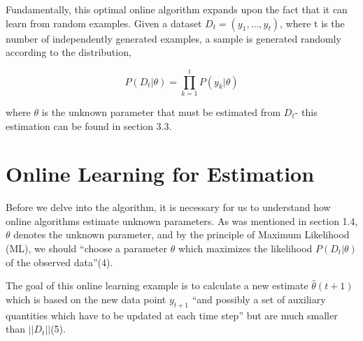 																																																																																	        \noindent Fundamentally, this optimal online algorithm expands upon the fact that it can learn from random examples. Given a dataset $D_t = (y_1,...,y_t)$, where t is the number of independently generated examples, a sample is generated randomly according to the distribution, 
																																																																																			        
																																																																																					        $$ P(D_t | \theta) = \prod_{k=1}^t P(y_k | \theta)$$
																																																																																							        
																																																																																									        \noindent where $\theta$ is the unknown parameter that must be estimated from $D_t$- this estimation can be found in section 3.3. 

																																																																																											\section{Online Learning for Estimation}   
																																																																																											    Before we delve into the algorithm, it is necessary for us to understand how  online algorithms estimate unknown parameters. As was mentioned in section 1.4, $\theta$ denotes the unknown parameter, and by the principle of Maximum Likelihood (ML), we should ``choose a parameter $\theta$ which maximizes the likelihood $P(D_t|\theta)$ of the observed data''(4).\vspace{4mm}
																																																																																												    
																																																																																													    \noindent The goal of this online learning example is to calculate a new estimate $\hat{\theta}(t+1)$ which is based on the new data point $y_{t+1}$ ``and possibly a set of auxiliary quantities which have to be updated at each time step'' but are much smaller than $||D_t||$(5). \vspace{4mm}
																																																																																														    
